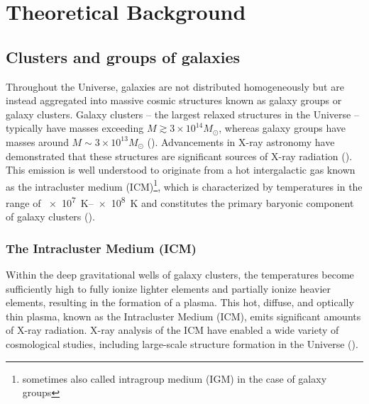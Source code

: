 
\chapter{Theoretical Background}
\label{sec:theoretical_background}
\section{Clusters and groups of galaxies}\label{sec:clusters}
Throughout the Universe, galaxies are not distributed homogeneously but are instead aggregated into massive cosmic structures known as galaxy groups or galaxy clusters. Galaxy clusters -- the largest relaxed structures in the Universe -- typically have masses exceeding \(M \gtrsim 3 \times 10^{14} M_{\odot}\), whereas galaxy groups have masses around \(M \sim 3 \times 10^{13} M_{\odot}\) (\cite{Schneider_2006}). Advancements in X-ray astronomy have demonstrated that these structures are significant sources of X-ray radiation (\cite{Cavaliere_1971}). This emission is well understood to originate from a hot intergalactic gas known as the intracluster medium (ICM)\footnote{sometimes also called intragroup medium (IGM) in the case of galaxy groups}, which is characterized by temperatures in the range of \SIrange{e7}{e8}{\kelvin} and constitutes the primary baryonic component of galaxy clusters (\cite{Schneider_2006}).
%
\subsection{The Intracluster Medium (ICM)}
Within the deep gravitational wells of galaxy clusters, the temperatures become sufficiently high to fully ionize lighter elements and partially ionize heavier elements, resulting in the formation of a plasma. This hot, diffuse, and optically thin plasma, known as the Intracluster Medium (ICM), emits significant amounts of X-ray radiation. X-ray analysis of the ICM have enabled a wide variety of cosmological studies, including large-scale structure formation in the Universe (\cite{KravtsovBorgani2012}).
%
